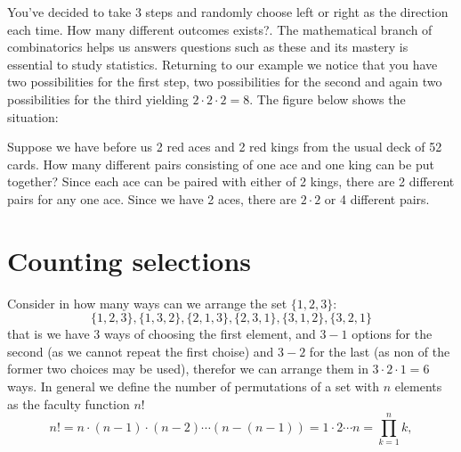 You've decided to take $3$ steps and randomly choose left or right as the direction each time. How many different outcomes exists?. The mathematical branch of combinatorics helps us answers questions such as these and its mastery is essential to study statistics. Returning to our example we notice that you have two possibilities for the first step, two possibilities for the second and again two possibilities for the third yielding $2 \cdot 2 \cdot 2 = 8$. The figure below shows the situation:
\begin{figure}[H]
\centering
{}
\end{figure}

Suppose we have before us 2 red aces and 2 red kings from the usual deck of 52 cards. How many different pairs consisting of one ace and one king can be put together? Since each ace can be paired with either of 2 kings, there are 2 different pairs for any one ace. Since we have 2 aces, there are $2 \cdot 2$ or 4 different pairs.

\section{Counting selections}
Consider in how many ways can we arrange the set $\{1,2,3\}$:
\[
\{1, 2, 3\}, \{1, 3, 2\}, \{2, 1, 3\}, \{2, 3, 1\}, \{3, 1, 2\}, \{3, 2, 1\}
\]
that is we have $3$ ways of choosing the first element, and $3-1$ options for the second (as we cannot repeat the first choise) and $3-2$ for the last (as non of the former two choices may be used), therefor we can arrange them in $3 \cdot 2 \cdot 1 = 6$ ways. In general we define the number of permutations of a set with $n$ elements as the faculty function $n!$
\[
n! = n \cdot (n-1) \cdot (n-2) \cdots  (n - (n -1)) = 1 \cdot 2 \cdots n = \prod_{k=1}^{n}k,
\]

